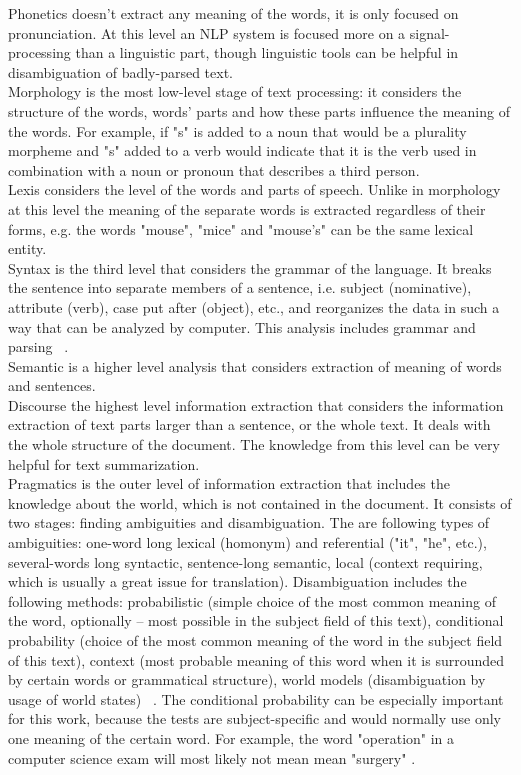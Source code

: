 Phonetics doesn't extract any meaning of the words, it is only focused on pronunciation. At this level an NLP system is focused more on a signal-processing than a linguistic part, though linguistic tools can be helpful in disambiguation of badly-parsed text.\\

Morphology is the most low-level stage of text processing: it considers the structure of the words, words' parts and how these parts influence the meaning of the words. For example, if "s" is added to a noun that would be a plurality morpheme and "s" added to a verb would indicate that it is the verb used in combination with a noun or pronoun that describes a third person.\\

Lexis considers the level of the words and parts of speech. Unlike in morphology at this level the meaning of the separate words is extracted regardless of their forms, e.g. the words "mouse", "mice" and "mouse's" can be the same lexical entity.\\

Syntax is the third level that considers the grammar of the language. It breaks the sentence into separate members of a sentence, i.e. subject (nominative), attribute (verb), case put after (object), etc., and reorganizes the data in such a way that can be analyzed by computer. This analysis includes grammar and parsing ~\cite{Saad}.\\

Semantic is a higher level analysis that considers extraction of meaning of words and sentences. \\

Discourse the highest level information extraction that considers the information extraction of text parts larger than a sentence, or the whole text. It deals with the whole structure of the document. The knowledge from this level can be very helpful for text summarization. \\

Pragmatics is the outer level of information extraction that includes the knowledge about the world, which is not contained in the document. It consists of two stages: finding ambiguities and disambiguation. The are following types of ambiguities: one-word long lexical (homonym) and referential ("it", "he", etc.), several-words long syntactic, sentence-long semantic, local (context requiring, which is usually a great issue for translation). Disambiguation includes the following methods: probabilistic (simple choice of the most common meaning of the word, optionally -- most possible in the subject field of this text), conditional probability (choice of the most common meaning of the word in the subject field of this text), context (most probable meaning of this word when it is surrounded by certain words or grammatical structure), world models (disambiguation by usage of world states)  ~\cite{Saad}. The conditional probability can be especially important for this work, because the tests are subject-specific and would normally use only one meaning of the certain word. For example, the word "operation" in a computer science exam will most likely not mean mean "surgery" . \\

